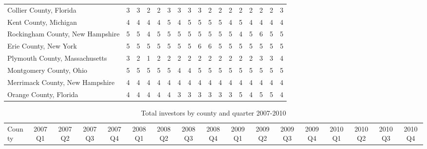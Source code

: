 \begin{landscape}
\begin{longtable}{lcccccccccccccccc}
		Collier County, Florida & 3 & 3 & 2 & 2 & 3 & 3 & 3 & 3 & 2 & 2 & 2 & 2 & 2 & 2 & 2 & 3 \\
		Kent County, Michigan & 4 & 4 & 4 & 4 & 5 & 4 & 5 & 5 & 5 & 5 & 4 & 5 & 4 & 4 & 4 & 4 \\
		Rockingham County, New Hampshire & 5 & 5 & 4 & 5 & 5 & 5 & 5 & 5 & 5 & 5 & 5 & 4 & 5 & 6 & 5 & 5 \\
		Erie County, New York & 5 & 5 & 5 & 5 & 5 & 5 & 5 & 6 & 6 & 5 & 5 & 5 & 5 & 5 & 5 & 5 \\
		Plymouth County, Massachusetts & 3 & 2 & 1 & 2 & 2 & 2 & 2 & 2 & 2 & 2 & 2 & 2 & 2 & 3 & 3 & 4 \\
		Montgomery County, Ohio & 5 & 5 & 5 & 5 & 5 & 4 & 4 & 5 & 5 & 5 & 5 & 5 & 5 & 5 & 5 & 5 \\
		Merrimack County, New Hampshire & 4 & 4 & 4 & 4 & 4 & 4 & 4 & 4 & 4 & 4 & 4 & 4 & 4 & 4 & 4 & 4 \\
		Orange County, Florida & 4 & 4 & 4 & 4 & 4 & 3 & 3 & 3 & 3 & 3 & 3 & 5 & 4 & 5 & 5 & 4

\end{longtable}



\newpage


\begin{longtable}{lcccccccccccccccc}
	\setlength{\tabcolsep}{8pt}
			\caption[Total Investors by County and Quarter 2007-2010]{Total investors by county and quarter 2007-2010}
	County &2007Q1 &2007Q2 &2007Q3 &2007Q4 &2008Q1 &2008Q2 &2008Q3 &2008Q4 &2009Q1 & 2009Q2 &2009Q3 &2009Q4 &2010Q1 &2010Q2 &2010Q3 & 2010Q4 \\


\end{longtable}
\end{landscape}
